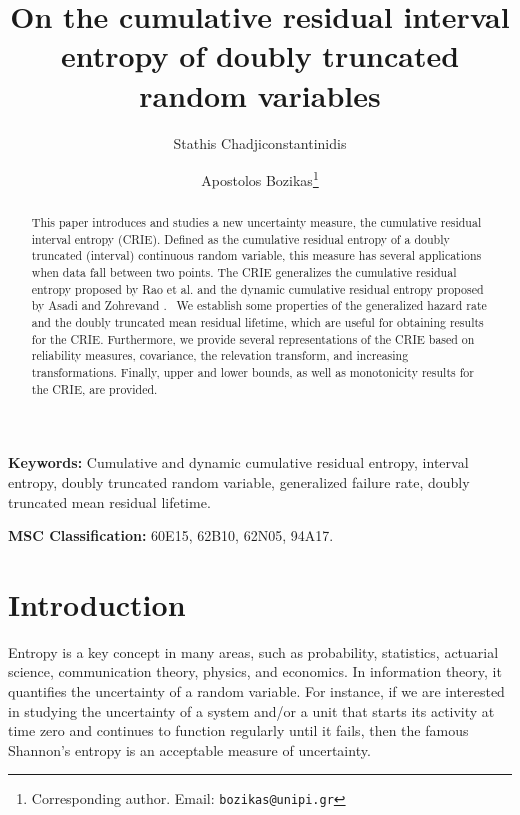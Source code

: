 \documentclass[11pt]{article}
\title{\textbf{On the cumulative residual interval entropy of doubly truncated random variables}}
\author{Stathis Chadjiconstantinidis}
\author{Apostolos Bozikas\thanks{Corresponding author. Email: \texttt{bozikas@unipi.gr}}}
\affil{Department of Statistics and Insurance Science, University of Piraeus, 80 Karaoli and Dimitriou str., Piraeus, 18534, Greece}
\date{}
\begin{document}
\maketitle
	
\begin{abstract}
This paper introduces and studies a new uncertainty measure, the cumulative residual interval entropy (CRIE). Defined as the cumulative residual entropy of a doubly truncated (interval) continuous random variable, this measure has several applications when data fall between two points. The CRIE generalizes the cumulative residual entropy proposed by Rao et al. \cite{Rao2004} %
and the dynamic cumulative residual entropy proposed by Asadi and Zohrevand \cite{Asadi2007}.%
~We establish some properties of the generalized hazard rate and the doubly truncated mean residual lifetime, which are useful for obtaining results for the CRIE. Furthermore, we provide several representations of the CRIE based on reliability measures, covariance, the relevation transform, and increasing transformations. Finally, upper and lower bounds, as well as monotonicity results for the CRIE, are provided.
\end{abstract}
	
\vspace{1em}
\noindent \textbf{Keywords:} Cumulative and dynamic cumulative residual entropy, interval entropy, doubly truncated random variable, generalized failure rate, doubly truncated mean residual lifetime.
	
\vspace{1em}
\noindent \textbf{MSC Classification:} 60E15, 62B10, 62N05, 94A17.


\section{Introduction} \label{sec1}

Entropy is a key concept in many areas, such as probability, statistics, actuarial science, communication theory, physics, and economics. In information theory, it quantifies the uncertainty of a random variable. For instance, if we are interested in studying the uncertainty of a system and/or a unit that starts its activity at time zero and continues to function regularly until it fails, then the famous Shannon’s entropy is an acceptable measure of uncertainty. 
\end{document}
